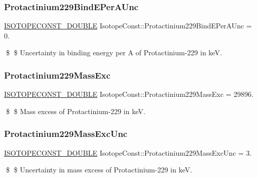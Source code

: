 \subsubsection{\texorpdfstring{Protactinium229\+Bind\+E\+Per\+A\+Unc}{Protactinium229BindEPerAUnc}}
{\footnotesize\ttfamily \mbox{\hyperlink{group___isotope_const-_macros_ga8f45a7272ce02c0b4c65c44636ed719a}{I\+S\+O\+T\+O\+P\+E\+C\+O\+N\+S\+T\+\_\+\+D\+O\+U\+B\+LE}} Isotope\+Const\+::\+Protactinium229\+Bind\+E\+Per\+A\+Unc = 0.}

\$ \$ Uncertainty in binding energy per A of Protactinium-\/229 in keV. \mbox{\label{group___isotope_const-_protactinium-_pa229_gaa379dff86245109a5a2f245fb5edcbdb}} 
\subsubsection{\texorpdfstring{Protactinium229\+Mass\+Exc}{Protactinium229MassExc}}
{\footnotesize\ttfamily \mbox{\hyperlink{group___isotope_const-_macros_ga8f45a7272ce02c0b4c65c44636ed719a}{I\+S\+O\+T\+O\+P\+E\+C\+O\+N\+S\+T\+\_\+\+D\+O\+U\+B\+LE}} Isotope\+Const\+::\+Protactinium229\+Mass\+Exc = 29896.}

\$ \$ Mass excess of Protactinium-\/229 in keV. \mbox{\label{group___isotope_const-_protactinium-_pa229_ga9c953ce93d07e023c19ed70083883a8e}} 
\subsubsection{\texorpdfstring{Protactinium229\+Mass\+Exc\+Unc}{Protactinium229MassExcUnc}}
{\footnotesize\ttfamily \mbox{\hyperlink{group___isotope_const-_macros_ga8f45a7272ce02c0b4c65c44636ed719a}{I\+S\+O\+T\+O\+P\+E\+C\+O\+N\+S\+T\+\_\+\+D\+O\+U\+B\+LE}} Isotope\+Const\+::\+Protactinium229\+Mass\+Exc\+Unc = 3.}

\$ \$ Uncertainty in mass excess of Protactinium-\/229 in keV. \mbox{\label{group___isotope_const-_protactinium-_pa229_gaa9a1c1577894c7d196237bdd688dac37}} 
